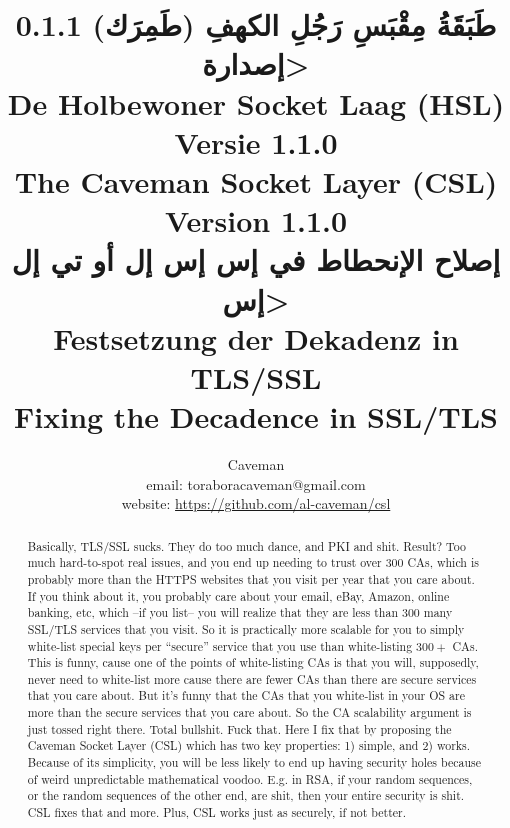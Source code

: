 \documentclass{article}
\author{Caveman\\
email: toraboracaveman@gmail.com\\
website: \url{https://github.com/al-caveman/csl}}
\title{
0.1.1 \<طَبَقَةُ مِقْبَسِ رَجُلِ الكهفِ (طَمِرَك) إصدارة>\\
De Holbewoner Socket Laag (HSL) Versie 1.1.0\\
The Caveman Socket Layer (CSL) Version 1.1.0\\
{\large \<إصلاح الإنحطاط في إس إس إل أو تي إل إس>}\\
{\large Festsetzung der Dekadenz in TLS/SSL}\\
{\large Fixing the Decadence in SSL/TLS}}
\begin{document}
 \maketitle
\begin{abstract}
    Basically, TLS/SSL sucks. They do too much dance, and PKI and shit. Result?
    Too much hard-to-spot real issues, and you end up needing to trust over
    $300$ CAs, which is probably more than the HTTPS websites that you visit
    per year that you care about. If you think about it, you probably care
    about your email, eBay, Amazon, online banking, etc, which --if you list--
    you will realize that they are less than $300$ many SSL/TLS services that
    you visit. So it is practically more scalable for you to simply white-list
    special keys per ``secure'' service that you use than white-listing $300+$
    CAs. This is funny, cause one of the points of white-listing CAs is that
    you will, supposedly, never need to white-list more cause there are fewer
    CAs than there are secure services that you care about. But it's funny that
    the CAs that you white-list in your OS are more than the secure services
    that you care about. So the CA scalability argument is just tossed right
    there. Total bullshit. Fuck that. Here I fix that by proposing the Caveman
    Socket Layer (CSL) which has two key properties: 1) simple, and 2) works.
    Because of its simplicity, you will be less likely to end up having
    security holes because of weird unpredictable mathematical voodoo. E.g. in
    RSA, if your random sequences, or the random sequences of the other end,
    are shit, then your entire security is shit.  CSL fixes that and more.
    Plus, CSL works just as securely, if not better.
\end{abstract}

\tableofcontents
\end{document}
